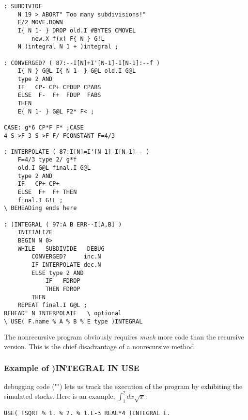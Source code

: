 \begin{multicols}{2}
\begin{lstlisting}
: SUBDIVIDE
    N 19 > ABORT" Too many subdivisions!"
    E/2 MOVE.DOWN
    I{ N 1- } DROP old.I #BYTES CMOVEL
        new.X f(x) F{ N } G!L
    N )integral N 1 + )integral ;

: CONVERGED? ( 87:--I[N]+I'[N-1]-I[N-1]:--f )
    I{ N } G@L I{ N 1- } G@L old.I G@L
    type 2 AND
    IF   CP- CP+ CPDUP CPABS
    ELSE  F-  F+  FDUP  FABS
    THEN
    E{ N 1- } G@L F2* F< ;

CASE: g*6 CP*F F* ;CASE
4 S->F 3 S->F F/ FCONSTANT F=4/3

: INTERPOLATE ( 87:I[N]=I'[N-1]-I[N-1]-- )
    F=4/3 type 2/ g*f
    old.I G@L final.I G@L
    type 2 AND
    IF   CP+ CP+
    ELSE  F+  F+ THEN
    final.I G!L ;
\ BEHEADing ends here

: )INTEGRAL ( 97:A B ERR--I[A,B] )
    INITIALIZE
    BEGIN N 0>
    WHILE   SUBDIVIDE   DEBUG
        CONVERGED?     inc.N
        IF INTERPOLATE dec.N
        ELSE type 2 AND
            IF   FDROP
            THEN FDROP
        THEN
    REPEAT final.I G@L ;
BEHEAD" N INTERPOLATE   \ optional
\ USE( F.name % A % B % E type )INTEGRAL
    \end{lstlisting}
\end{multicols}

The nonrecursive program obviously requires \textit{much} more code than the recursive version. This is the chief disadvantage of a nonrecursive method.

\subsubsection{Example of )INTEGRAL IN USE}
 debugging code ("") lets us track the execution of the program by exhibiting the simulated stacks. Here is an example, $\int_{1}^{2} dx \sqrt{x}$:
\begin{lstlisting}
USE( FSQRT % 1. % 2. % 1.E-3 REAL*4 )INTEGRAL E.
\end{lstlisting}

